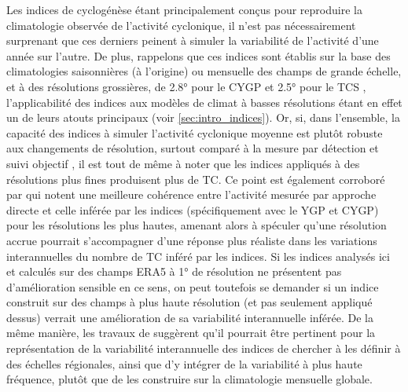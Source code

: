 \documentclass[../main.tex]{subfiles}
\begin{document}
Les indices de cyclogénèse étant principalement conçus pour reproduire la climatologie observée de l'activité cyclonique, il n'est pas nécessairement surprenant
que ces derniers peinent à simuler la variabilité de l'activité d'une année sur l'autre. De plus, rappelons que ces indices sont établis sur la base des
climatologies saisonnières (à l'origine) ou mensuelle des champs de grande échelle, et à des résolutions grossières, de \ang{2.8} pour le CYGP
\parencite{royer_gcm_1998} et \ang{2.5} pour le TCS \parencite{tippett_poisson_2011}, l'applicabilité des indices aux modèles de climat à basses résolutions
étant en effet un de leurs atouts principaux (voir \cref{sec:intro_indices}). Or, si, dans l'ensemble, la capacité des indices à simuler l'activité cyclonique
moyenne est plutôt robuste aux changements de résolution, surtout comparé à la mesure par détection et suivi objectif \parencite[][voir aussi
\cref{fig:GP_resolution}]{camargo_tropical_2007}, il est tout de même à noter que les indices appliqués à des résolutions plus fines produisent plus de TC. Ce
point est également corroboré par \textcite{mcdonald_tropical_2005} qui notent une meilleure cohérence entre l'activité mesurée par approche directe et celle
inférée par les indices (spécifiquement avec le YGP et CYGP) pour les résolutions les plus hautes, amenant alors \textcite{camargo_tropical_2007} à spéculer
qu'une résolution accrue pourrait s'accompagner d'une réponse plus réaliste dans les variations interannuelles du nombre de TC inféré par les indices. Si les
indices analysés ici et calculés sur des champs ERA5 à \ang{1} de résolution ne présentent pas d'amélioration sensible en ce sens, on peut toutefois se demander
si un indice construit sur des champs à plus haute résolution (et pas seulement appliqué dessus) verrait une amélioration de sa variabilité interannuelle
inférée. De la même manière, les travaux de \textcite{bruyere_investigating_2012,waters_largescale_2012} suggèrent qu'il pourrait être pertinent pour la
représentation de la variabilité interannuelle des indices de chercher à les définir à des échelles régionales, ainsi que d'y intégrer de la variabilité à plus
haute fréquence, plutôt que de les construire sur la climatologie mensuelle globale.
\end{document}
